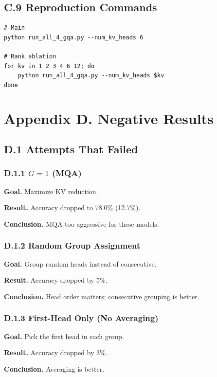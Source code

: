 \subsection{C.9 Reproduction Commands}

\begin{lstlisting}
# Main
python run_all_4_gqa.py --num_kv_heads 6

# Rank ablation
for kv in 1 2 3 4 6 12; do
    python run_all_4_gqa.py --num_kv_heads $kv
done
\end{lstlisting}


\section{Appendix D. Negative Results}

\subsection{D.1 Attempts That Failed}

\subsubsection{D.1.1 $G = 1$ (MQA)}

\textbf{Goal.} Maximize KV reduction.

\textbf{Result.} Accuracy dropped to 78.0\% (12.7\%).

\textbf{Conclusion.} MQA too aggressive for these models.

\subsubsection{D.1.2 Random Group Assignment}

\textbf{Goal.} Group random heads instead of consecutive.

\textbf{Result.} Accuracy dropped by 5\%.

\textbf{Conclusion.} Head order matters; consecutive grouping is better.

\subsubsection{D.1.3 First-Head Only (No Averaging)}

\textbf{Goal.} Pick the first head in each group.

\textbf{Result.} Accuracy dropped by 3\%.

\textbf{Conclusion.} Averaging is better.

